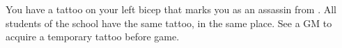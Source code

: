 \documentclass[char]{NeptuneBall}
\begin{document}
\begin{itemz}[Notes]
  \item You have a tattoo on your left bicep that marks you as an assassin from \pAssassin{}. All students of the school have the same tattoo, in the same place. See a GM to acquire a temporary tattoo before game.
\end{itemz}
\begin{contacts}
  \contact{}
\end{contacts}
\end{document}
